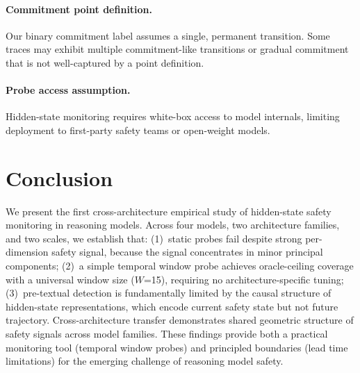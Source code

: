 \documentclass[11pt,a4paper]{article}
\begin{document}
\paragraph{Commitment point definition.} Our binary commitment label assumes a single, permanent transition.  Some traces may exhibit multiple commitment-like transitions or gradual commitment that is not well-captured by a point definition.

\paragraph{Probe access assumption.} Hidden-state monitoring requires white-box access to model internals, limiting deployment to first-party safety teams or open-weight models.

\section{Conclusion}

We present the first cross-architecture empirical study of hidden-state safety monitoring in reasoning models.
Across four models, two architecture families, and two scales, we establish that:
(1)~static probes fail despite strong per-dimension safety signal, because the signal concentrates in minor principal components;
(2)~a simple temporal window probe achieves oracle-ceiling coverage with a universal window size ($W$=15), requiring no architecture-specific tuning;
(3)~pre-textual detection is fundamentally limited by the causal structure of hidden-state representations, which encode current safety state but not future trajectory.
Cross-architecture transfer demonstrates shared geometric structure of safety signals across model families.
These findings provide both a practical monitoring tool (temporal window probes) and principled boundaries (lead time limitations) for the emerging challenge of reasoning model safety.


\end{document}

